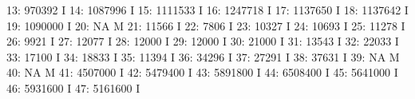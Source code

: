 \documentclass[nojss]{jss}
\begin{document}
\begin{Schunk}
\begin{Soutput}
 13:                     970392                                          I
 14:                    1087996                                          I
 15:                    1111533                                          I
 16:                    1247718                                          I
 17:                    1137650                                          I
 18:                    1137642                                          I
 19:                    1090000                                          I
 20:                         NA                                          M
 21:                      11566                                          I
 22:                       7806                                          I
 23:                      10327                                          I
 24:                      10693                                          I
 25:                      11278                                          I
 26:                       9921                                          I
 27:                      12077                                          I
 28:                      12000                                          I
 29:                      12000                                          I
 30:                      21000                                          I
 31:                      13543                                          I
 32:                      22033                                          I
 33:                      17100                                          I
 34:                      18833                                          I
 35:                      11394                                          I
 36:                      34296                                          I
 37:                      27291                                          I
 38:                      37631                                          I
 39:                         NA                                          M
 40:                         NA                                          M
 41:                    4507000                                          I
 42:                    5479400                                          I
 43:                    5891800                                          I
 44:                    6508400                                          I
 45:                    5641000                                          I
 46:                    5931600                                          I
 47:                    5161600                                          I

\end{Soutput}
\end{Schunk}
\end{document}
